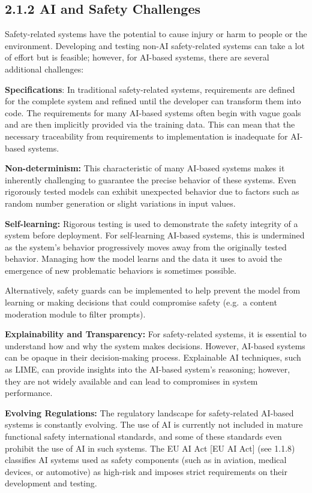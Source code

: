 \documentclass[
  letterpaper,
  DIV=11,
  numbers=noendperiod,
  oneside]{scrreprt}
\begin{document}
\begin{tcolorbox}
\section{2.1.2 AI and Safety Challenges}\label{ai-and-safety-challenges}

Safety-related systems have the potential to cause injury or harm to
people or the environment. Developing and testing non-AI safety-related
systems can take a lot of effort but is feasible; however, for AI-based
systems, there are several additional challenges:

\textbf{Specifications}: In traditional safety-related systems,
requirements are defined for the complete system and refined until the
developer can transform them into code. The requirements for many
AI-based systems often begin with vague goals and are then implicitly
provided via the training data. This can mean that the necessary
traceability from requirements to implementation is inadequate for
AI-based systems.

\textbf{Non-determinism:} This characteristic of many AI-based systems
makes it inherently challenging to guarantee the precise behavior of
these systems. Even rigorously tested models can exhibit unexpected
behavior due to factors such as random number generation or slight
variations in input values.

\textbf{Self-learning:} Rigorous testing is used to demonstrate the
safety integrity of a system before deployment. For self-learning
AI-based systems, this is undermined as the system's behavior
progressively moves away from the originally tested behavior. Managing
how the model learns and the data it uses to avoid the emergence of new
problematic behaviors is sometimes possible.

Alternatively, safety guards can be implemented to help prevent the
model from learning or making decisions that could compromise safety
(e.g.~a content moderation module to filter prompts).

\textbf{Explainability and Transparency:} For safety-related systems, it
is essential to understand how and why the system makes decisions.
However, AI-based systems can be opaque in their decision-making
process. Explainable AI techniques, such as LIME, can provide insights
into the AI-based system's reasoning; however, they are not widely
available and can lead to compromises in system performance.

\textbf{Evolving Regulations:} The regulatory landscape for
safety-related AI-based systems is constantly evolving. The use of AI is
currently not included in mature functional safety international
standards, and some of these standards even prohibit the use of AI in
such systems. The EU AI Act {[}EU AI Act{]} (see 1.1.8) classifies AI
systems used as safety components (such as in aviation, medical devices,
or automotive) as high-risk and imposes strict requirements on their
development and testing.


\end{tcolorbox}
\end{document}
